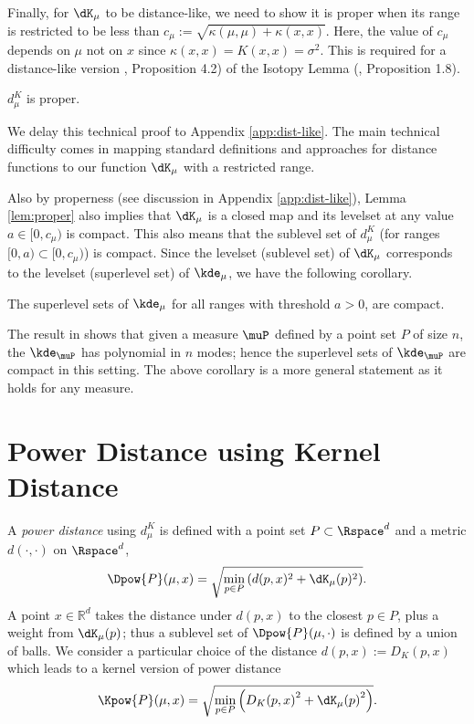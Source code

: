 \documentclass[11pt]{myclass}
\begin{document}
Finally, for $\dK_\mu$ to be distance-like, we need to show it is proper when its range is restricted to be less than $c_\mu := \sqrt{\kappa(\mu, \mu) + \kappa(x,x)}$. Here, the value of $c_\mu$ depends on $\mu$ not on $x$ since $\kappa(x,x) = K(x,x) = \sigma^2$.
This is required for a distance-like version \cite{ChazalCohen-SteinerMerigot2011}, Proposition 4.2) of the Isotopy Lemma (\cite{Grove1993}, Proposition 1.8).  

\begin{lemma}[D3] 
$d^K_{\mu}$ is proper. 
\label{lem:proper}
\end{lemma}


We delay this technical proof to Appendix \ref{app:dist-like}.  
The main technical difficulty comes in mapping standard definitions and approaches for distance functions to our function $\dK_\mu$ with a restricted range.  

Also by properness (see discussion in Appendix \ref{app:dist-like}), Lemma \ref{lem:proper} also implies that $\dK_\mu$ is a closed map and its levelset at any value $a \in [0, c_\mu)$ is compact. 
This also means that the sublevel set of $d^K_{\mu}$ (for ranges $[0, a) \subset [0, c_\mu)$) is compact. Since the levelset (sublevel set) of $\dK_{\mu}$ corresponds to the levelset (superlevel set) of $\kde_{\mu}$, we have the following corollary.  
\begin{corollary}
The superlevel sets of $\kde_{\mu}$ for all ranges with threshold $a > 0$, are compact. 
\end{corollary}
The result in \cite{EFR12} shows that given a measure $\muP$ defined by a point set $P$ of size $n$, the $\kde_{\muP}$ has polynomial in $n$ modes; hence the superlevel sets of $\kde_{\muP}$ are compact in this setting.  The above corollary is a more general statement as it holds for any measure.  








\section{Power Distance using Kernel Distance}
\label{sec:powerdistance}
A \emph{power distance} using $d^K_{\mu}$ is defined with a point set $P \subset \Rspace^d$ and a metric $d(\cdot, \cdot)$ on $\Rspace^d$,  
\[
\Dpow{P}(\mu, x) = \sqrt{\min_{p \in P}  \left( d(p,x)^2 + \dK_\mu(p)^2 \right)}.
\]
A point $x \in \mathbb{R}^d$ takes the distance under $d(p,x)$ to the closest $p \in P$, plus a weight from $\dK_\mu(p)$; thus a sublevel set of $\Dpow{P}(\mu, \cdot)$ is defined by a union of balls.  
We consider a particular choice of the distance $d(p,x) := D_K(p,x)$ which leads to a kernel version of power distance
\[
\Kpow{P}(\mu, x) = \sqrt{\min_{p \in P} \left( {D_K(p,x)}^2 + {\dK_\mu(p)}^2 \right) }.  
\]
\end{document}
